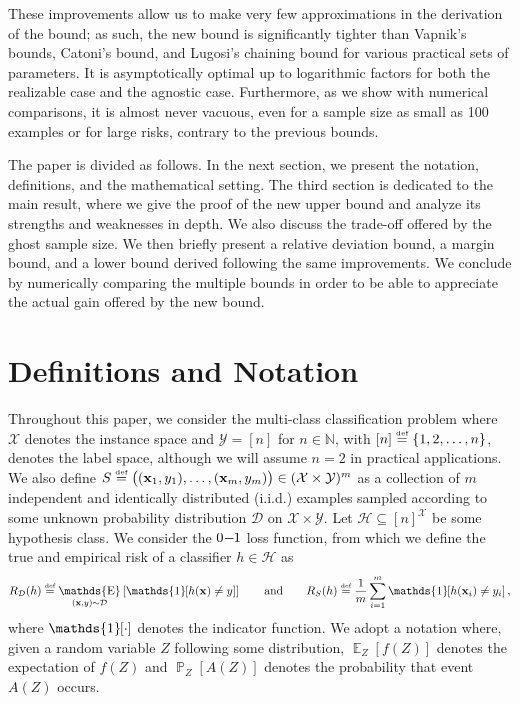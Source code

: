 \documentclass[twoside,11pt]{article}
\newcommand{\zeroone}{\mbox{$0\hspace*{-2pt}-\hspace*{-3pt}1$}\xspace}
\newcommand{\Id}[1]{\mathds{1}\hspace{-2.5pt}\left[#1\right]}
\newcommand{\D}{\mathcal{D}}
\renewcommand{\H}{{\mathcal{H}}}
\newcommand{\x}{\mathbf{x}}
\newcommand{\X}{\mathcal{X}}
\newcommand{\Y}{\mathcal{Y}}
\newcommand{\naturals}{\mathds{N}}
\newcommand{\eqdef}{\overset{\smash{\mbox{\tiny \rm def}}}{=}}
\DeclareMathOperator*{\Prob}{\mathds{P}}
\newcommand{\prob}[2]{\Prob_{#1}\left[#2\right]}
\DeclareMathOperator*{\Expectation}{\mathds{E}}
\newcommand{\exv}[2]{\Expectation_{#1}\left[#2\right]}
\begin{document}
These improvements allow us to make very few approximations in the derivation of the bound; as such, the new bound is significantly tighter than Vapnik's bounds, Catoni's bound, and Lugosi's chaining bound for various practical sets of parameters.
It is asymptotically optimal up to logarithmic factors for both the realizable case and the agnostic case.
Furthermore, as we show with numerical comparisons, it is almost never vacuous, even for a sample size as small as 100 examples or for large risks, contrary to the previous bounds.

The paper is divided as follows.
In the next section, we present the notation, definitions, and the mathematical setting.
The third section is dedicated to the main result, where we give the proof of the new upper bound and analyze its strengths and weaknesses in depth.
We also discuss the trade-off offered by the ghost sample size.
We then briefly present a relative deviation bound, a margin bound, and a lower bound derived following the same improvements.
We conclude by numerically comparing the multiple bounds in order to be able to appreciate the actual gain offered by the new bound.








\section{Definitions and Notation}

Throughout this paper, we consider the multi-class classification problem where $\X$ denotes the instance space and $\Y = [n]$ for $n \in \naturals$, with $[n] \eqdef \{1,2,\dots,n\}$, denotes the label space, although we will assume $n=2$ in practical applications.
We also define $S \eqdef \big( (\x_1, y_1), \dots, (\x_m, y_m) \big) \in (\X\times \Y)^m$ as a collection of $m$ independent and identically distributed (i.i.d.) examples sampled according to some unknown probability distribution $\D$ on $\X\times\Y$.
Let $\H \subseteq [n]^{\X}$ be some hypothesis class.
We consider the \zeroone loss function, from which we define the true and empirical risk of a classifier $h\in\H$ as
\begin{equation*}
  R_\D(h) \eqdef \exv{(\x,y)\sim \D}{\Id{h(\x) \ne y}} \qquad \textnormal{and} \qquad
  R_S(h) \eqdef \frac{1}{m} \sum_{i=1}^m \Id{h(\x_i) \ne y_i},
\end{equation*}
where $\Id{\cdot}$ denotes the indicator function.
We adopt a notation where, given a random variable $Z$ following some distribution, $\exv{Z}{f(Z)}$ denotes the expectation of $f(Z)$ and $\prob{Z}{A(Z)}$ denotes the probability that event $A(Z)$ occurs.
\end{document}
